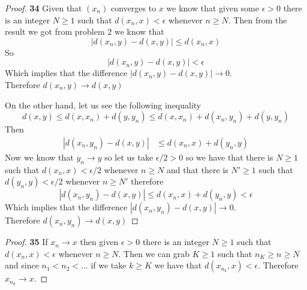 \documentclass[11pt]{article}
\theoremstyle{definition}
\begin{document}
    \begin{proof}{\textbf{34}}
        Given that $(x_n)$ converges to $x$ we know that given some $\epsilon > 0$ there
        is an integer $N \geq 1$ such that $d(x_n,x) < \epsilon$ whenever $n \geq N$.
        Then from the result we got from problem $2$ we know that
        $$|d(x_n,y) - d(x,y)| \leq d(x_n,x)$$
        So
        $$|d(x_n,y) - d(x,y)| < \epsilon$$
        Which implies that the difference $|d(x_n,y) - d(x,y)| \rightarrow 0$.\\
        Therefore $d(x_n,y) \rightarrow d(x,y)$

        On the other hand, let us see the following inequality
        $$d(x,y) \leq d(x,x_n) + d(y,y_n) \leq d(x,x_n) + d(x_n, y_n) + d(y,y_n)$$
        Then
        \begin{align*}
            |d(x_n,y_n) - d(x,y)| &\leq d(x_n,x) + d(y_n,y)
        \end{align*}
        Now we know that $y_n \rightarrow y$ so let us take $\epsilon/2 > 0$ so we have
        that there is $N \geq 1$ such that
        $d(x_n,x) < \epsilon /2$ whenever $n \geq N$ and that there is $N' \geq 1$ such
        that $d(y_n,y) < \epsilon /2$ whenever $n \geq N'$ therefore
        $$|d(x_n,y_n) - d(x,y)| \leq d(x_n,x) + d(y_n,y) < \epsilon$$
        Which implies that the difference $|d(x_n,y_n) - d(x,y)| \rightarrow 0$.\\
        Therefore $d(x_n,y_n) \rightarrow d(x,y)$
    \end{proof}
    \begin{proof}{\textbf{35}}
        If $x_n \rightarrow x$ then given $\epsilon > 0$ there is an integer $N \geq 1$
        such that $d(x_n,x) < \epsilon$ whenever $n \geq N$. Then we can grab
        $K \geq 1$ such that $n_K \geq n \geq N$ and since $n_1 < n_2 < ...$ if we take
        $k \geq K$ we have that $d(x_{n_k},x) < \epsilon$. Therefore
        $x_{n_k} \rightarrow x$.
    \end{proof}
\cleardoublepage
\end{document}
